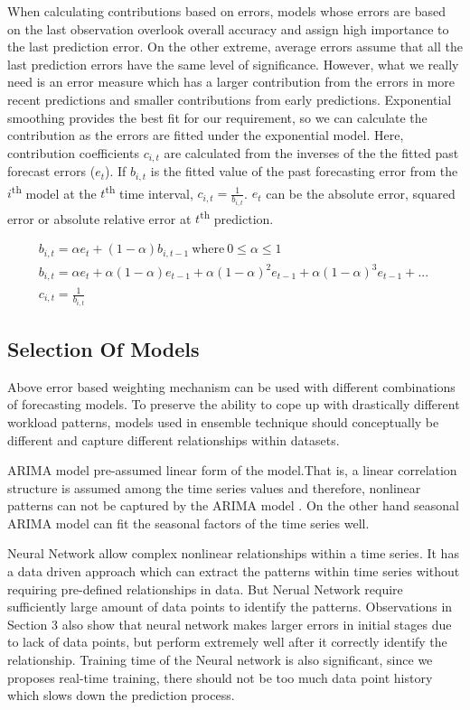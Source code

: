 When calculating contributions based on errors, models whose errors are based on the last observation overlook overall accuracy and assign high importance to the last prediction error. On the other extreme, average errors assume that all the last prediction errors have the same level of significance. However, what we really need is an error measure which has a larger contribution from the errors in more recent predictions and smaller contributions from early predictions. Exponential smoothing provides the best fit for our requirement, so we can calculate the contribution as the errors are fitted under the exponential model. Here, contribution coefficients $c_{i,t}$ are calculated from the inverses of the the fitted past forecast errors ($e_{t}$). If $b_{i,t}$ is the fitted value of the past forecasting error from the $i$\textsuperscript{th} model at the $t$\textsuperscript{th} time interval, $c_{i,t}=\frac{1}{b_{i,t}}$. $e_{t}$ can be the absolute error, squared error or absolute relative error at $t$\textsuperscript{th} prediction.

\begin{multline}
b_{i,t}= \alpha e_t + (1-\alpha)b_{i,t-1} \ \mathrm{where} \ 0\leq \alpha \leq 1	\\ 
b_{i,t}=\alpha e_t + \alpha(1-\alpha)e_{t-1}+\alpha(1-\alpha)^2e_{t-1}+\alpha(1-\alpha)^3e_{t-1}+ . .. \  \\
 c_{i,t}=\frac{1}{b_{i,t}}
\end{multline}

\subsection{Selection Of Models}

Above error based weighting mechanism can be used with different combinations of forecasting models. To preserve the ability to cope up with drastically different workload patterns, models used in ensemble technique should conceptually be different and capture different relationships within datasets.

ARIMA model pre-assumed linear form of the model.That is, a linear correlation  structure is assumed among the time series values and therefore,  nonlinear patterns can not be captured by the ARIMA model \cite{Zhang_2003}. On the other hand seasonal ARIMA model can fit the seasonal factors of the time series well. 

Neural Network allow complex nonlinear relationships within a time series. It has a data driven approach which can extract the patterns within time series without requiring pre-defined relationships in data. But Nerual Network require sufficiently large amount of data points to identify the patterns. Observations in Section 3 also show that neural network makes larger errors in initial stages due to lack of data points, but perform extremely well after it correctly identify the relationship. Training time of the Neural network is also significant, since we proposes real-time training, there should not be too much data point history which slows down the prediction process.

